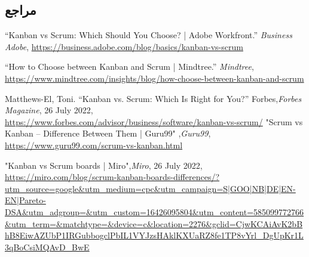 \subsection*{مراجع}

\begin{latin}
	\begingroup
	\renewcommand{\section}[2]{}%
	
\begin{thebibliography}{9}

	“Kanban vs Scrum: Which Should You Choose? | Adobe Workfront.” ‌\textit{Business Adobe}, \url{https://business.adobe.com/blog/basics/kanban-vs-scrum} 

	“How to Choose between Kanban and Scrum | Mindtree.” \textit{Mindtree}, \url{https://www.mindtree.com/insights/blog/how-choose-between-kanban-and-scrum}

	Matthews-El, Toni. “Kanban vs. Scrum: Which Is Right for You?” Forbes,\textit{Forbes Magazine}, 26 July 2022, \url{https://www.forbes.com/advisor/business/software/kanban-vs-scrum/}
	"Scrum vs Kanban – Difference Between Them | Guru99" ,\textit{Guru99}, \url{https://www.guru99.com/scrum-vs-kanban.html}

	"Kanban vs Scrum boards | Miro",\textit{Miro}, 26 July 2022, \url{https://miro.com/blog/scrum-kanban-boards-differences/?utm_source=google&utm_medium=cpc&utm_campaign=S|GOO|NB|DE|EN-EN|Pareto-DSA&utm_adgroup=&utm_custom=16426095804&utm_content=585099772766&utm_term=&matchtype=&device=c&location=2276&gclid=CjwKCAiAvK2bBhB8EiwAZUbP1IRGubbogclPbIL1VYJzsHAklKXUaRZ8fe1TP8vYrl_DgUpKr1L3qBoCsiMQAvD_BwE}
        
	
\end{thebibliography}
\endgroup
\end{latin}






